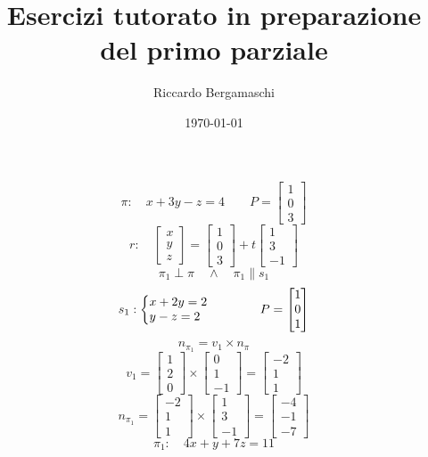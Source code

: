 \documentclass{article}
\title{Esercizi tutorato in preparazione del primo parziale}
\author{Riccardo Bergamaschi}
\date{\today}
\begin{document}
\maketitle
\section{}
\subsection{}
\[\pi:\quad x+3y-z=4\qquad P=\begin{bmatrix} 1 \\ 0 \\ 3 \end{bmatrix}\]
\[r:\quad \begin{bmatrix}x\\y\\z\end{bmatrix}=\begin{bmatrix}1\\0\\3\end{bmatrix}+t\begin{bmatrix}1\\3\\-1\end{bmatrix}\]
\[\pi_1 \perp \pi\quad\wedge\quad\pi_1\parallel s_1\]
\[
    s_1:\left\{\begin{array}{@{}l@{}}
        x + 2y = 2 \\
        y - z = 2 \\
    \end{array}\right.\qquad\qquad P=\begin{bmatrix} 1 \\ 0 \\ 1
    \end{bmatrix}
\]
\[n_{\pi_1} = v_1\times n_{\pi}\]
\[
    v_1 =
    \begin{bmatrix}1\\2\\0\end{bmatrix} \times
    \begin{bmatrix}0\\1\\-1\end{bmatrix} =
    \begin{bmatrix}-2\\1\\1\end{bmatrix}
\]
\[
    n_{\pi_1} =
    \begin{bmatrix}-2\\1\\1\end{bmatrix} \times
    \begin{bmatrix}1\\3\\-1\end{bmatrix} =
    \begin{bmatrix}-4\\-1\\-7\end{bmatrix}
\]
\[\pi_1:\quad4x+y+7z=11\]
\end{document}
